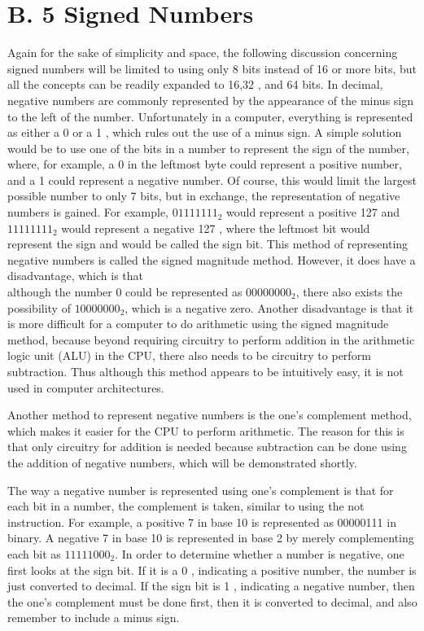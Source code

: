 \documentclass[10pt]{article}
\begin{document}
\section*{B. 5 Signed Numbers}
Again for the sake of simplicity and space, the following discussion concerning signed numbers will be limited to using only 8 bits instead of 16 or more bits, but all the concepts can be readily expanded to 16,32 , and 64 bits. In decimal, negative numbers are commonly represented by the appearance of the minus sign to the left of the number. Unfortunately in a computer, everything is represented as either a 0 or a 1 , which rules out the use of a minus sign. A simple solution would be to use one of the bits in a number to represent the sign of the number, where, for example, a 0 in the leftmost byte could represent a positive number, and a 1 could represent a negative number. Of course, this would limit the largest possible number to only 7 bits, but in exchange, the representation of negative numbers is gained. For example, $01111111_{2}$ would represent a positive 127 and $11111111_{2}$ would represent a negative 127 , where the leftmost bit would represent the sign and would be called the sign bit. This method of representing negative numbers is called the signed magnitude method. However, it does have a disadvantage, which is that\\
although the number 0 could be represented as $00000000_{2}$, there also exists the possibility of $10000000_{2}$, which is a negative zero. Another disadvantage is that it is more difficult for a computer to do arithmetic using the signed magnitude method, because beyond requiring circuitry to perform addition in the arithmetic logic unit (ALU) in the CPU, there also needs to be circuitry to perform subtraction. Thus although this method appears to be intuitively easy, it is not used in computer architectures.

Another method to represent negative numbers is the one's complement method, which makes it easier for the CPU to perform arithmetic. The reason for this is that only circuitry for addition is needed because subtraction can be done using the addition of negative numbers, which will be demonstrated shortly.

The way a negative number is represented using one's complement is that for each bit in a number, the complement is taken, similar to using the not instruction. For example, a positive 7 in base 10 is represented as 00000111 in binary. A negative 7 in base 10 is represented in base 2 by merely complementing each bit as $11111000_{2}$. In order to determine whether a number is negative, one first looks at the sign bit. If it is a 0 , indicating a positive number, the number is just converted to decimal. If the sign bit is 1 , indicating a negative number, then the one's complement must be done first, then it is converted to decimal, and also remember to include a minus sign.
\end{document}
